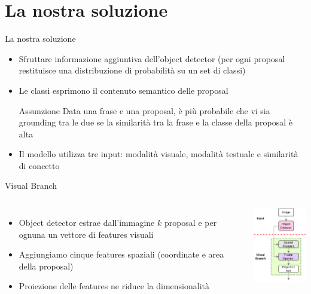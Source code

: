 \documentclass{beamer}
\begin{document}
\section{La nostra soluzione}

\begin{frame}{La nostra soluzione}
  \begin{itemize}
    \item Sfruttare informazione aggiuntiva dell'object detector (per
    ogni proposal restituisce una \alert{distribuzione di probabilità}
    su un set di classi)
    \item Le classi esprimono il \alert{contenuto semantico} delle
    proposal
    \vspace{0.5cm}
    \begin{alertblock}{Assunzione}
      Data una frase e una proposal, è più probabile che vi sia
      grounding tra le due se la \alert{similarità} tra la frase e la
      classe della proposal è alta
    \end{alertblock}
    \vspace{0.5cm}
    \item Il modello utilizza \alert{tre input}: modalità visuale,
    modalità testuale e similarità di concetto 
  \end{itemize}
\end{frame}

\begin{frame}{Visual Branch}
  \begin{columns}
      \begin{itemize}
        \item Object detector estrae dall'immagine $k$ proposal e per
        ognuna un vettore di \alert{features visuali}
        \item Aggiungiamo cinque \alert{features spaziali} (coordinate e
        area della proposal)
        \item \alert{Proiezione} delle features ne riduce la dimensionalità
      \end{itemize}
      \centering
      \includegraphics[width=3.5cm]{images/visual-branch.png}
  \end{columns}
\end{frame}
\end{document}
